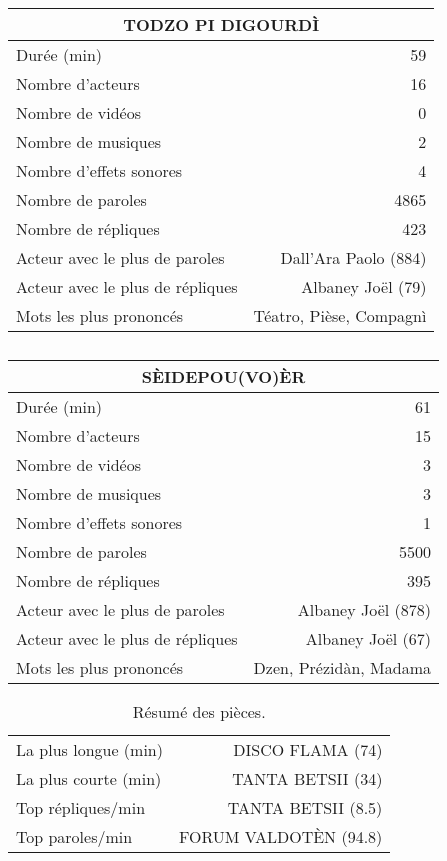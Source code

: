     \begin{table}[]
    \centering
    \caption{}
    \begin{tabular}{lr}\toprule\multicolumn{2}{c}{TODZO PI DIGOURDÌ} \\\midrule
\multicolumn{1}{l}{Durée (min)}&59\\
\multicolumn{1}{l}{Nombre d'acteurs}&16\\
\multicolumn{1}{l}{Nombre de vidéos}&0\\
\multicolumn{1}{l}{Nombre de musiques}&2\\
\multicolumn{1}{l}{Nombre d'effets sonores}&4\\
\multicolumn{1}{l}{Nombre de paroles}&4865\\
\multicolumn{1}{l}{Nombre de répliques}&423\\
\multicolumn{1}{l}{Acteur avec le plus de paroles}&Dall'Ara Paolo (884)\\
\multicolumn{1}{l}{Acteur avec le plus de répliques}&Albaney Joël (79)\\
\multicolumn{1}{l}{Mots les plus prononcés}&Téatro, Pièse, Compagnì\\
    \bottomrule
    \end{tabular}%
    \end{table}
    \begin{table}[]
    \centering
    \caption{}
    \begin{tabular}{lr}\toprule\multicolumn{2}{c}{SÈIDEPOU(VO)ÈR} \\\midrule
\multicolumn{1}{l}{Durée (min)}&61\\
\multicolumn{1}{l}{Nombre d'acteurs}&15\\
\multicolumn{1}{l}{Nombre de vidéos}&3\\
\multicolumn{1}{l}{Nombre de musiques}&3\\
\multicolumn{1}{l}{Nombre d'effets sonores}&1\\
\multicolumn{1}{l}{Nombre de paroles}&5500\\
\multicolumn{1}{l}{Nombre de répliques}&395\\
\multicolumn{1}{l}{Acteur avec le plus de paroles}&Albaney Joël (878)\\
\multicolumn{1}{l}{Acteur avec le plus de répliques}&Albaney Joël (67)\\
\multicolumn{1}{l}{Mots les plus prononcés}&Dzen, Prézidàn, Madama\\
    \bottomrule
    \end{tabular}%
    \end{table}
\begin{table}[h]
\centering
\caption{Résumé des pièces.}
\begin{tabular}{lr}
    \toprule
La plus longue (min) & DISCO FLAMA (74) \\
La plus courte (min) & TANTA BETSII (34) \\
Top répliques/min & TANTA BETSII (8.5) \\
Top paroles/min & FORUM VALDOTÈN (94.8) \\
\bottomrule
\end{tabular}%
\end{table}
